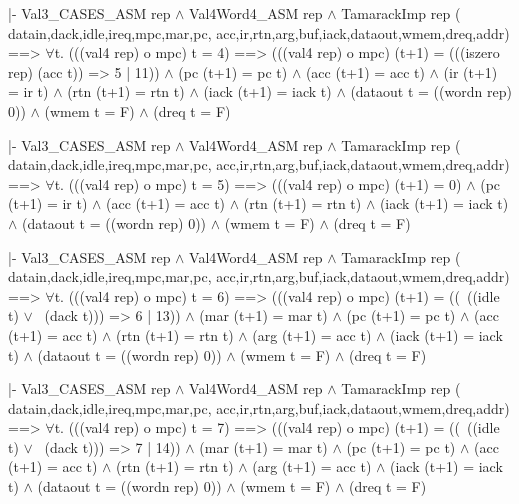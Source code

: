 \begintt
|- Val3_CASES_ASM rep \(\wedge\)
   Val4Word4_ASM rep \(\wedge\)
   TamarackImp rep (
     datain,dack,idle,ireq,mpc,mar,pc,
     acc,ir,rtn,arg,buf,iack,dataout,wmem,dreq,addr)
   ==>
   \(\forall\)t.
    (((val4 rep) o mpc) t = 4)
    ==>
    (((val4 rep) o mpc) (t+1) = (((iszero rep) (acc t)) => 5 | 11)) \(\wedge\)
    (pc (t+1) = pc t) \(\wedge\)
    (acc (t+1) = acc t) \(\wedge\)
    (ir (t+1) = ir t) \(\wedge\)
    (rtn (t+1) = rtn t) \(\wedge\)
    (iack (t+1) = iack t) \(\wedge\)
    (dataout t = ((wordn rep) 0)) \(\wedge\)
    (wmem t = F) \(\wedge\)
    (dreq t = F)
\endtt

\begintt
|- Val3_CASES_ASM rep \(\wedge\)
   Val4Word4_ASM rep \(\wedge\)
   TamarackImp rep (
     datain,dack,idle,ireq,mpc,mar,pc,
     acc,ir,rtn,arg,buf,iack,dataout,wmem,dreq,addr)
   ==>
   \(\forall\)t.
    (((val4 rep) o mpc) t = 5)
    ==>
    (((val4 rep) o mpc) (t+1) = 0) \(\wedge\)
    (pc (t+1) = ir t) \(\wedge\)
    (acc (t+1) = acc t) \(\wedge\)
    (rtn (t+1) = rtn t) \(\wedge\)
    (iack (t+1) = iack t) \(\wedge\)
    (dataout t = ((wordn rep) 0)) \(\wedge\)
    (wmem t = F) \(\wedge\)
    (dreq t = F)
\endtt
\newpage %


\begintt
|- Val3_CASES_ASM rep \(\wedge\)
   Val4Word4_ASM rep \(\wedge\)
   TamarackImp rep (
     datain,dack,idle,ireq,mpc,mar,pc,
     acc,ir,rtn,arg,buf,iack,dataout,wmem,dreq,addr)
   ==>
   \(\forall\)t.
    (((val4 rep) o mpc) t = 6)
    ==>
    (((val4 rep) o mpc) (t+1) =
      ((~((idle t) \(\vee\) ~(dack t))) => 6 | 13)) \(\wedge\)
    (mar (t+1) = mar t) \(\wedge\)
    (pc (t+1) = pc t) \(\wedge\)
    (acc (t+1) = acc t) \(\wedge\)
    (rtn (t+1) = rtn t) \(\wedge\)
    (arg (t+1) = acc t) \(\wedge\)
    (iack (t+1) = iack t) \(\wedge\)
    (dataout t = ((wordn rep) 0)) \(\wedge\)
    (wmem t = F) \(\wedge\)
    (dreq t = F)
\endtt

\begintt
|- Val3_CASES_ASM rep \(\wedge\)
   Val4Word4_ASM rep \(\wedge\)
   TamarackImp rep (
     datain,dack,idle,ireq,mpc,mar,pc,
     acc,ir,rtn,arg,buf,iack,dataout,wmem,dreq,addr)
   ==>
   \(\forall\)t.
    (((val4 rep) o mpc) t = 7)
    ==>
    (((val4 rep) o mpc) (t+1) =
      ((~((idle t) \(\vee\) ~(dack t))) => 7 | 14)) \(\wedge\)
    (mar (t+1) = mar t) \(\wedge\)
    (pc (t+1) = pc t) \(\wedge\)
    (acc (t+1) = acc t) \(\wedge\)
    (rtn (t+1) = rtn t) \(\wedge\)
    (arg (t+1) = acc t) \(\wedge\)
    (iack (t+1) = iack t) \(\wedge\)
    (dataout t = ((wordn rep) 0)) \(\wedge\)
    (wmem t = F) \(\wedge\)
    (dreq t = F)
\endtt

